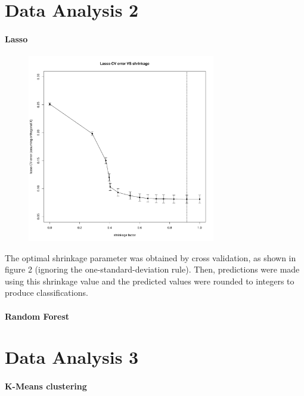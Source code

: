 \documentclass{article}
\begin{document}
\section*{Data Analysis 2}
\paragraph{Lasso}

\begin{figure}[h]				%
	\centering
	\includegraphics[width=8.2cm]{DA2/Plots/Lasso_CVerr_VS_S.pdf}
	\caption{}
\end{figure}

The optimal shrinkage parameter was obtained by cross validation, as shown in figure 2 (ignoring the one-standard-deviation rule). Then, predictions were made using this shrinkage value and the predicted values were rounded to integers to produce classifications.

\paragraph{Random Forest}




\section*{Data Analysis 3}
\paragraph{K-Means clustering}
\end{document}
